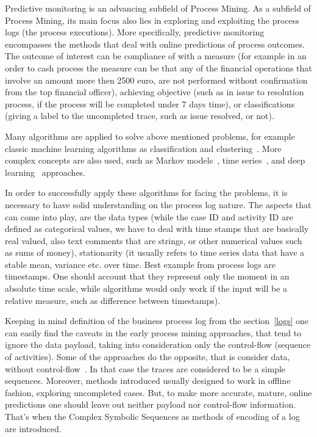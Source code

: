 Predictive monitoring is an advancing subfield of Process Mining. As a subfield of Process Mining, its main focus also lies in exploring and exploiting the process logs (the process executions). More specifically, predictive monitoring encompasses the methods that deal with online predictions of process outcomes. The outcome of interest can be compliance of with a measure (for example in an order to cash process the measure can be that any of the financial operations that involve an amount more then 2500 euro, are not performed without confirmation from the top financial officer), achieving objective (such as in issue to resolution process, if the process will be completed under 7 days time), or classifications (giving a label to the uncompleted trace, such as issue resolved, or not).  
\par
Many algorithms are applied to solve above mentioned problems, for example classic machine learning algorithms as classification and clustering~\cite{Leontjeva2015}. More complex concepts are also used, such as Markov models~\cite{Leontjeva2015}, time series~\cite{Lam20096986}, and deep learning~\cite{niek96732,evermann,quteprints96732} approaches. 
\par
In order to successfully apply these algorithms for facing the problems, it is necessary to have solid understanding on the process log nature. The aspects that can come into play, are the data types (while the case ID and activity ID are defined as categorical values, we have to deal with time stamps that are basically real valued, also text comments that are strings, or other numerical values such as sums of money), stationarity (it usually refers to time series data that have a stable mean, variance etc. over time. Best example from process logs are timestamps. One should account that they represent only the moment in an absolute time scale, while algorithms would only work if the input will be a relative measure, such as difference between timestamps). 
\par
Keeping in mind definition of the business process log from the section~\ref{logs} one can easily find the caveats in the early process mining approaches, that tend to ignore the data payload, taking into consideration only the control-flow (sequence of activities). Some of the approaches do the opposite, that is consider data, without control-flow~\cite{vanderAalst2010,DBLP:journals/is/AalstSS11,Schonenberg2008}. In that case the traces are considered to be a simple sequences. Moreover, methods introduced usually designed to work in offline fashion, exploring uncompleted cases. But, to make more accurate, mature, online predictions one should leave out neither payload nor control-flow information. That's when the Complex Symbolic Sequences as methods of encoding of a log are introduced. 


